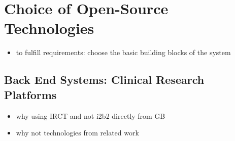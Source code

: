 \section{Choice of Open-Source Technologies}
\begin{itemize}
    \item to fulfill requirements: choose the basic building blocks of the system
\end{itemize}


\subsection{Back End Systems: Clinical Research Platforms}








\begin{itemize}
    \item why using IRCT and not i2b2 directly from GB
    \item why not technologies from related work
\end{itemize}


